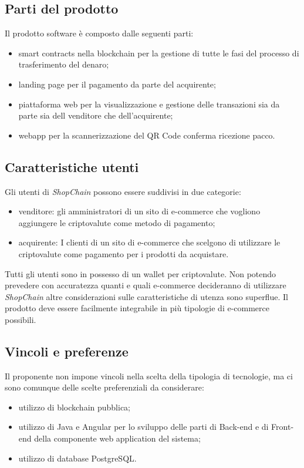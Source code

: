 \documentclass[a4paper, 12pt]{article}
\begin{document}
\subsection{Parti del prodotto}
Il prodotto software è composto dalle seguenti parti:
\begin{itemize}
\item smart contracts nella blockchain per la gestione di tutte le fasi del processo di trasferimento del denaro;
\item landing page per il pagamento da parte del acquirente;
\item piattaforma web per la visualizzazione e gestione delle transazioni sia da parte sia dell venditore che dell'acquirente;
\item webapp per la scannerizzazione del QR Code conferma ricezione pacco.
\end{itemize}
\subsection{Caratteristiche utenti}
Gli utenti di \textit{ShopChain} possono essere suddivisi in due categorie:
\begin{itemize}
\item venditore: gli amministratori di un sito di e-commerce che vogliono aggiungere le criptovalute come metodo di pagamento;
\item acquirente: I clienti di un sito di e-commerce che scelgono di utilizzare le criptovalute come pagamento per i prodotti da acquistare.
\end{itemize}
Tutti gli utenti sono in possesso di un wallet per criptovalute. 
Non potendo prevedere con accuratezza quanti e quali e-commerce decideranno di utilizzare \textit{ShopChain} altre considerazioni sulle caratteristiche di utenza sono superflue. Il prodotto deve essere facilmente integrabile in più tipologie di e-commerce possibili.

\subsection{Vincoli e preferenze}
Il proponente non impone vincoli nella scelta della tipologia di tecnologie, ma ci sono comunque delle scelte preferenziali da considerare:
\begin{itemize}
\item utilizzo di blockchain pubblica;
\item utilizzo di Java e Angular per lo sviluppo delle parti di Back-end e di Front-end della componente web application del sistema;
\item utilizzo di database PostgreSQL.
\end{itemize}
\end{document}
